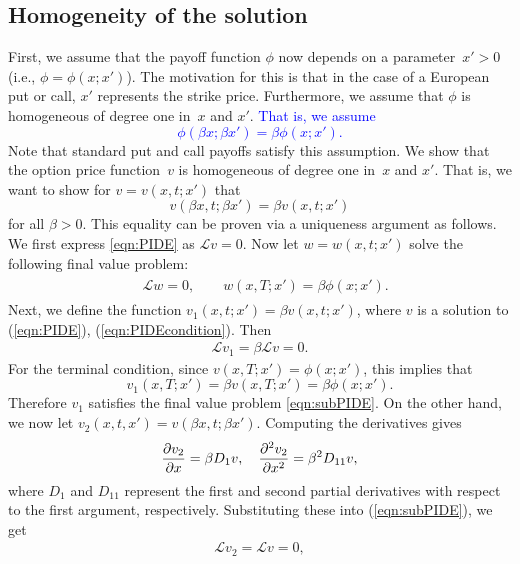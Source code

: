 \subsection{Homogeneity of the solution}
First, we assume that the payoff function $\phi$ now depends on a parameter~$x' > 0$ (i.e., $\phi = \phi(x;x')$).  The motivation for this is that in the case of a European put or call, $x'$ represents the strike price. Furthermore, we assume that $\phi$ is homogeneous of degree one in~$x$ and $x'$. \textcolor{blue}{That is, we assume
$$
	\phi(\beta x; \beta x') = \beta \phi(x;x').
$$}
Note that standard put and call payoffs satisfy this assumption. We show that the option price function~$v$ is homogeneous of degree one in~$x$ and $x'$. That is, we want to show for $v = v(x,t; x')$ that
		\begin{equation}
			\label{eqn:homogen}
			v(\beta x, t; \beta x') = \beta v(x,t; x')
		\end{equation}
for all $\beta > 0$. This equality can be proven via a uniqueness argument as follows. We first express \eqref{eqn:PIDE} as $\mathscr{L} v = 0$. Now let $w = w(x,t; x')$ solve the following final value problem:
		\begin{align}
			\label{eqn:subPIDE}
			\begin{split}
			&\mathscr{L}w = 0, \qquad w(x,T; x') = \beta\phi(x;x').
			\end{split}
		\end{align}
Next, we define the function $v_1(x,t;x') = \beta v(x,t;x')$, where $v$ is a solution to (\ref{eqn:PIDE}), (\ref{eqn:PIDEcondition}). Then
	\begin{align*}
		\mathscr{L}v_1 = \beta \mathscr{L}v = 0.
	\end{align*}
For the terminal condition, since $v(x,T;x') = \phi(x;x')$, this implies that
	\begin{equation*}
		v_1(x,T;x') = \beta v(x,T; x') = \beta\phi(x;x').
	\end{equation*}
Therefore $v_1$ satisfies the final value problem \eqref{eqn:subPIDE}. On the other hand, we now let $v_2(x,t,x') = v(\beta x, t; \beta x')$. Computing the derivatives gives
	\begin{equation*}
		\frac{\partial v_2}{\partial x} = \beta D_1v, \quad \frac{\partial^2 v_2}{\partial x^2} = \beta^2 D_{11}v,
	\end{equation*}
where $D_1$ and $D_{11}$ represent the first and second partial derivatives with respect to the first argument, respectively. Substituting these into (\ref{eqn:subPIDE}), we get
	\begin{align*}
		\mathscr{L}v_2 = \mathscr{L}v = 0,
	\end{align*}
